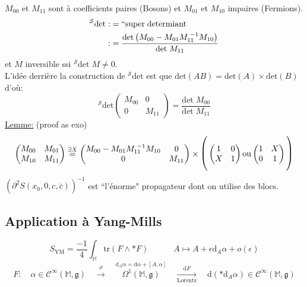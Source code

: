 \documentclass[a4paper,11pt]{article}
\renewcommand{\d}{{\mathrm{d}}}
\begin{document}
$M_{00}$ et $M_{11}$ sont à coefficients paires (Bosons) et $M_{01}$ et $M_{10}$ impaires (Fermions). 
\begin{align*}
^\mathcal{S}\mathrm{det} :&= ``\mathrm{super}\;\mathrm{determiant}\\
:&=\frac{\mathrm{det}\left(M_{00}-M_{01}M_{11}^{\;-1}M_{10}\right)}{\mathrm{det}\;M_{11}}
\end{align*}
et $M$ inversible ssi $^\mathcal{S}\mathrm{det}\;M \ne 0$.\\L'idée derrière la construction de $^\mathcal{S}\mathrm{det}$ est que $\mathrm{det}(AB)=\mathrm{det}(A)\times\mathrm{det}(B)$ d'où: $$^\mathcal{S}\mathrm{det} \left(\begin{matrix}
M_{00}&0\\0&M_{11}
\end{matrix}\right) = \frac{\mathrm{det}\; M_{00}}{\mathrm{det}\; M_{11}}$$
\underline{Lemme:} (proof as exo)
$$\left(\begin{matrix}
M_{00} & M_{01}\\
M_{10} & M_{11}
\end{matrix}\right)
\overset{\exists X}=
\left(\begin{matrix}
M_{00}-M_{01}M_{11}^{\;-1}M_{10} & 0\\
0 & M_{11}
\end{matrix}\right)
\times
\mathlarger{\mathlarger{\Bigg(}}\left(\begin{matrix}
1 & 0\\ X & 1
\end{matrix}\right)
\mathrm{ou}
\left(\begin{matrix}
1 & X\\ 0 & 1
\end{matrix}\right)\mathlarger{\mathlarger{\Bigg)}}
$$
$\left(\partial^2S(x_0,0,c,\bar c)\right)^{-1}$ est ``l'énorme" propagateur dont on utilise des blocs.

\subsection{Application à Yang-Mills}
$$S_\mathrm{YM}= \frac{-1}4 \int_\mathbb{M}\mathrm{tr}(F\wedge*F)\quad\quad\quad A\mapsto A+\epsilon\d_A\alpha + o(\epsilon)$$
$$F: \quad \alpha \in \mathcal{C}^\infty(\mathbb{M},\mathfrak{g}) \quad \overset\rho\longrightarrow\quad  \overset{\d_A\alpha = \d\alpha+[A,\alpha]}{\Omega^1(\mathbb{M},\mathfrak{g})} \quad \underset{\mathrm{Lorentz}}{\overset{\d F}\longrightarrow} \quad \d(*\d_A\alpha)\in \mathcal{C}^\infty(\mathbb{M},\mathfrak{g})$$
\end{document}
